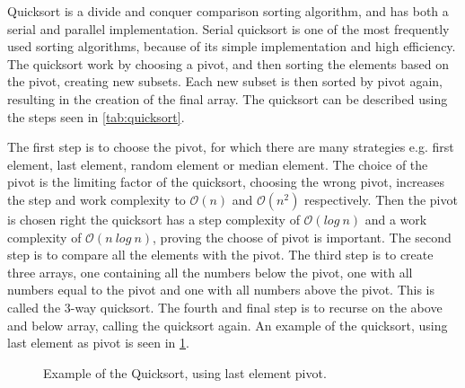 Quicksort is a divide and conquer comparison sorting algorithm, and has both a serial and parallel implementation. Serial quicksort is one of the most frequently used sorting algorithms, because of its simple implementation and high efficiency. The quicksort work by choosing a pivot, and then sorting the elements based on the pivot, creating new subsets. Each new subset is then sorted by pivot again, resulting in the creation of the final array. The quicksort can be described using the steps seen in \cref{tab:quicksort}.

\begin{center}
	\label{tab:quicksort}
\end{center} 

The first step is to choose the pivot, for which there are many strategies e.g. first element, last element, random element or median element. The choice of the pivot is the limiting factor of the quicksort, choosing the wrong pivot, increases the step and work complexity to $\mathcal{O}(n)$ and $\mathcal{O}(n^2)$ respectively. Then the pivot is chosen right the quicksort has a step complexity of $\mathcal{O}(log ~ n)$ and a work complexity of $\mathcal{O}(n~log~n)$, proving the choose of pivot is important. The second step is to compare all the elements with the pivot. The third step is to create three arrays, one containing all the numbers below the pivot, one with all numbers equal to the pivot and one with all numbers above the pivot. This is called the 3-way quicksort. The fourth and final step is to recurse on the above and below array, calling the quicksort again. An example of the quicksort, using last element as pivot is seen in \cref{fig:sort_quicksort}.

\begin{figure}[ht]
	\centering
	\caption{Example of the Quicksort, using last element pivot.}
	\label{fig:sort_quicksort}
\end{figure}  

